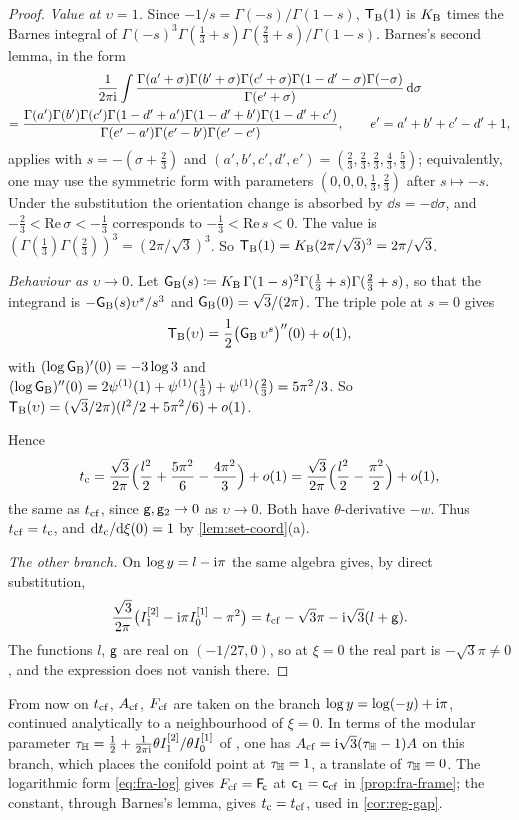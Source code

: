 \begin{proof}
\emph{Value at $\upsilon=1$.} Since $-1/s=\Gamma(-s)/\Gamma(1-s)$, $\mathsf{T}_{\mathrm{B}}(1)$ is $K_{\mathrm{B}}$ times the Barnes integral of $\Gamma(-s)^3\Gamma(\tfrac13+s)\Gamma(\tfrac23+s)/\Gamma(1-s)$. Barnes's second lemma, in the form
\begin{multline*}
\frac{1}{2\pi\mathrm{i}}\int\frac{\Gamma(a'+\sigma)\Gamma(b'+\sigma)\Gamma(c'+\sigma)\Gamma(1-d'-\sigma)\Gamma(-\sigma)}{\Gamma(e'+\sigma)}\,\mathrm{d}\sigma\\
=\frac{\Gamma(a')\Gamma(b')\Gamma(c')\Gamma(1-d'+a')\Gamma(1-d'+b')\Gamma(1-d'+c')}{\Gamma(e'-a')\Gamma(e'-b')\Gamma(e'-c')},\qquad e'=a'+b'+c'-d'+1,
\end{multline*}
applies with $s=-(\sigma+\tfrac23)$ and $(a',b',c',d',e')=(\tfrac23,\tfrac23,\tfrac23,\tfrac43,\tfrac53)$; equivalently, one may use the symmetric form with parameters $(0,0,0,\tfrac13,\tfrac23)$ after $s\mapsto-s$. Under the substitution the orientation change is absorbed by $\dd s=-\dd\sigma$, and $-\tfrac23<\mathrm{Re}\,\sigma<-\tfrac13$ corresponds to $-\tfrac13<\mathrm{Re}\,s<0$. The value is $(\Gamma(\tfrac13)\Gamma(\tfrac23))^3=(2\pi/\sqrt3)^3$. So $\mathsf{T}_{\mathrm{B}}(1)=K_{\mathrm{B}}(2\pi/\sqrt3)^3=2\pi/\sqrt3$.

\emph{Behaviour as $\upsilon\to0$.} Let $\mathsf{G}_{\mathrm{B}}(s)\coloneqq K_{\mathrm{B}}\,\Gamma(1-s)^2\Gamma(\tfrac13+s)\Gamma(\tfrac23+s)$, so that the integrand is $-\mathsf{G}_{\mathrm{B}}(s)\upsilon^s/s^3$ and $\mathsf{G}_{\mathrm{B}}(0)=\sqrt3/(2\pi)$. The triple pole at $s=0$ gives
\[
\mathsf{T}_{\mathrm{B}}(\upsilon)=\frac12\big(\mathsf{G}_{\mathrm{B}}\,\upsilon^s\big)''(0)+o(1),
\]
with $(\log\mathsf{G}_{\mathrm{B}})'(0)=-3\log3$ and $(\log\mathsf{G}_{\mathrm{B}})''(0)=2\psi^{(1)}(1)+\psi^{(1)}(\tfrac13)+\psi^{(1)}(\tfrac23)=5\pi^2/3$. So $\mathsf{T}_{\mathrm{B}}(\upsilon)=(\sqrt3/2\pi)(l^2/2+5\pi^2/6)+o(1)$.

Hence
\[
t_{\mathrm{c}}=\frac{\sqrt3}{2\pi}\Big(\frac{l^2}{2}+\frac{5\pi^2}{6}-\frac{4\pi^2}{3}\Big)+o(1)=\frac{\sqrt3}{2\pi}\Big(\frac{l^2}{2}-\frac{\pi^2}{2}\Big)+o(1),
\]
the same as $t_{\mathrm{cf}}$, since $\mathsf{g},\mathsf{g}_{2}\to0$ as $\upsilon\to0$. Both have $\theta$-derivative $-w$. Thus $t_{\mathrm{cf}}=t_{\mathrm{c}}$, and $\mathrm{d}t_{\mathrm{c}}/\mathrm{d}\xi(0)=1$ by \cref{lem:set-coord}(a).

\emph{The other branch.} On $\log y=l-\mathrm{i}\pi$ the same algebra gives, by direct substitution,
\[
\frac{\sqrt3}{2\pi}\big(I_1^{[2]}-\mathrm{i}\pi I_0^{[1]}-\pi^2\big)=t_{\mathrm{cf}}-\sqrt3\pi-\mathrm{i}\sqrt3(l+\mathsf{g}).
\]
The functions $l$, $\mathsf{g}$ are real on $(-1/27,0)$, so at $\xi=0$ the real part is $-\sqrt3\pi\neq0$, and the expression does not vanish there.
\end{proof}

\begin{rmk}
\label{rmk:fra-branch}
From now on $t_{\mathrm{cf}}$, $A_{\mathrm{cf}}$, $F_{\mathrm{cf}}$ are taken on the branch $\log y=\log(-y)+\mathrm{i}\pi$, continued analytically to a neighbourhood of $\xi=0$. In terms of the modular parameter $\tau_{\mathbb{H}}=\frac12+\frac{1}{2\pi\mathrm{i}}\theta I_1^{[2]}/\theta I_0^{[1]}$ of \cite{BS}, one has $A_{\mathrm{cf}}=\mathrm{i}\sqrt3(\tau_{\mathbb{H}}-1)A$ on this branch, which places the conifold point at $\tau_{\mathbb{H}}=1$, a translate of $\tau_{\mathbb{H}}=0$. The logarithmic form \eqref{eq:fra-log} gives $F_{\mathrm{cf}}=\mathsf{F}_{\!\mathsf{c}}$ at $\mathsf{c}_{1}=\mathsf{c}_{\mathrm{cf}}$ in \cref{prop:fra-frame}; the constant, through Barnes's lemma, gives $t_{\mathrm{c}}=t_{\mathrm{cf}}$, used in \cref{cor:reg-gap}.
\end{rmk}

